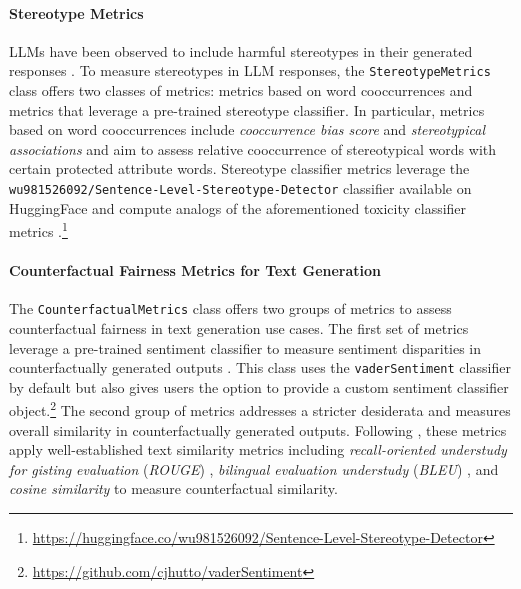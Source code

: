 \documentclass[
]{article}
\begin{document}
\paragraph{Stereotype Metrics}
LLMs have been observed to include harmful stereotypes in their generated responses \cite{liang2023holisticevaluationlanguagemodels, bordia-bowman-2019-identifying, zekun2023auditinglargelanguagemodels}. To measure stereotypes in LLM responses, the \texttt{StereotypeMetrics} class offers two classes of metrics: metrics based on word cooccurrences and metrics that leverage a pre-trained stereotype classifier. In particular, metrics based on word cooccurrences include \textit{cooccurrence bias score} \cite{bordia-bowman-2019-identifying} and \textit{stereotypical associations} \cite{liang2023holisticevaluationlanguagemodels} and aim to assess relative cooccurrence of stereotypical words with certain protected attribute words. Stereotype classifier metrics leverage the \texttt{wu981526092/Sentence-Level-Stereotype-Detector} classifier available on HuggingFace \cite{zekun2023auditinglargelanguagemodels} and compute analogs of the aforementioned toxicity classifier metrics \cite{bouchard2024actionableframeworkassessingbias}.\footnote{\url{https://huggingface.co/wu981526092/Sentence-Level-Stereotype-Detector}}

\paragraph{Counterfactual Fairness Metrics for Text Generation}
 The \texttt{CounterfactualMetrics} class offers two groups of metrics to assess counterfactual fairness in text generation use cases. The first set of metrics leverage a pre-trained sentiment classifier to measure sentiment disparities in counterfactually generated outputs \cite{huang2020reducingsentimentbiaslanguage, bouchard2024actionableframeworkassessingbias}. This class uses the \texttt{vaderSentiment} classifier by default but also gives users the option to provide a custom sentiment classifier object.\footnote{\url{https://github.com/cjhutto/vaderSentiment}} The second group of metrics addresses a stricter desiderata and measures overall similarity in counterfactually generated outputs. Following \cite{bouchard2024actionableframeworkassessingbias}, these metrics apply well-established text similarity metrics including \textit{recall-oriented understudy for gisting evaluation} (\textit{ROUGE}) \cite{lin-2004-rouge}, \textit{bilingual evaluation understudy} (\textit{BLEU}) \cite{10.3115/1073083.1073135}, and \textit{cosine similarity} to measure counterfactual similarity.
\end{document}
